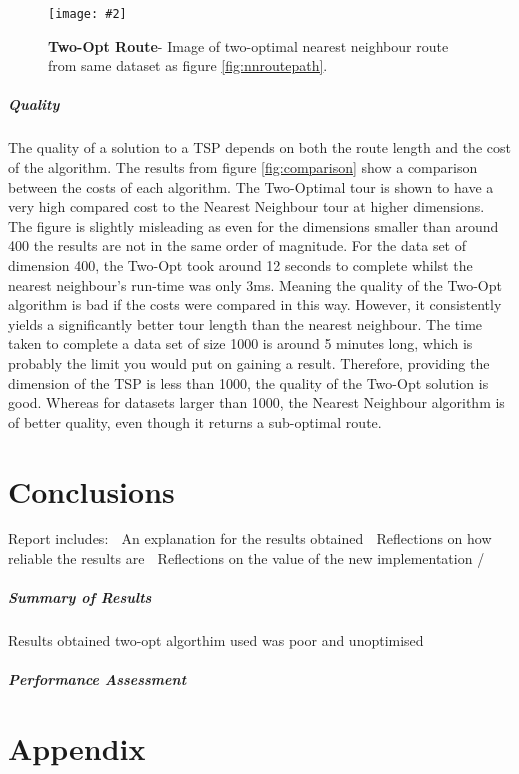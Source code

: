 \documentclass[10pt, a4paper]{article}
\newcommand{\figuremacro}[5]{
    \begin{figure}[#1]
        \centering
        \texttt{[image: \#2]}
        \caption[#3]{\textbf{#3}#4}
        \label{fig:#2}
    \end{figure}
}
\begin{document}
	\figuremacro{H}{twooptpath}{Two-Opt Route}{- Image of two-optimal nearest neighbour route from same dataset as figure \ref{fig:nnroutepath}.}{1.0}
		

	\subparagraph{Quality}
	
	The quality of a solution to a TSP depends on both the route length and the cost of the algorithm. The results from figure \ref{fig:comparison} show a comparison between the costs of each algorithm. The Two-Optimal tour is shown to have a very high compared cost to the Nearest Neighbour tour at higher dimensions. The figure is slightly misleading as even for the dimensions smaller than around 400 the results are not in the same order of magnitude. For the data set of dimension 400, the Two-Opt took around 12 seconds to complete whilst the nearest neighbour's run-time was only 3ms. Meaning the quality of the Two-Opt algorithm is bad if the costs were compared in this way. However, it consistently yields a significantly better tour length than the nearest neighbour. 
	The time taken to complete a data set of size 1000 is around 5 minutes long, which is probably the limit you would put on gaining a result. Therefore, providing the dimension of the TSP is less than 1000, the quality of the Two-Opt solution is good. Whereas for datasets larger than 1000, the Nearest Neighbour algorithm is of better quality, even though it returns a sub-optimal route.
	
	\section{Conclusions}
	Report includes:
	 An explanation for the
	results obtained
	 Reflections on how reliable
	the results are
	 Reflections on the value of
	the new implementation /
	
	\subparagraph{Summary of Results}
	
	Results obtained two-opt algorthim used was poor and unoptimised
	
	\subparagraph{Performance Assessment}
   

\newpage
\newpage
\section{Appendix}




		
\end{document}
